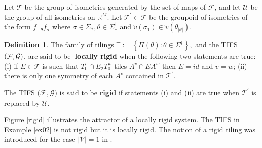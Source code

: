\documentclass{amsproc}
\theoremstyle{plain}
\theoremstyle{definition}
\newtheorem{definition}{Definition}
\numberwithin{equation}{section}
\begin{document}
Let $\mathcal{T}$ be the group of isometries generated by the set of maps of 
$\mathcal{F}$, and let $\mathcal{U}$ be the group of all isometries on $%
\mathbb{R}^{M}$. Let $\mathcal{T}^{\prime }\subset \mathcal{T}$ be the
groupoid of isometries of the form $f_{-\theta }f_{\sigma }$ where $\sigma
\in \Sigma _{\ast },\theta \in \Sigma _{\ast }^{\dag }$ and $\overleftarrow{v%
}(\sigma _{1})\in \overleftarrow{v}(\theta _{\left\vert \theta \right\vert
}).$

\begin{definition}
\label{localdef} The family of tilings $\mathbb{T}:=\left\{ \Pi (\theta
):\theta \in \Sigma ^{\dag }\right\} ,$ and the TIFS $(\mathcal{F},\mathcal{%
G)}$, are said to be\textbf{\ locally rigid} when the following two
statements are true: (i) if $E\in \mathcal{T}$ is such that $T_{0}^{v}\cap
E_{2}T_{0}^{w}$ tiles $A^{v}\cap EA^{w}$ then $E=id$ and $v=w$; (ii) there
is only one symmetry of each $A^{v}$ contained in $\mathcal{T}^{\prime }$.

The TIFS $(\mathcal{F},\mathcal{G)}$ is said to be \textbf{rigid} if
statements (i) and (ii) are true when $\mathcal{T}^{\prime }$ is replaced by 
$\mathcal{U}$.
\end{definition}

Figure \ref{rigid} illustrates the attractor of a locally rigid system. The
TIFS in Example \ref{ex02} is not rigid but it is locally rigid. The notion
of a rigid tiling was introduced for the case $\left\vert \mathcal{V}%
\right\vert =1$ in \cite{barnsleyvince}.
\end{document}
